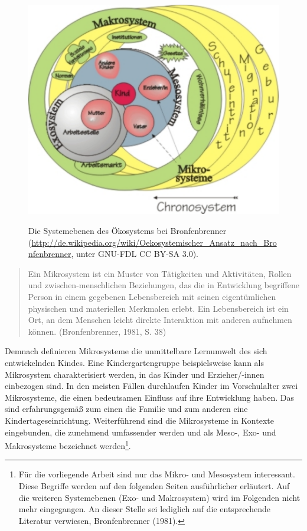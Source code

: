 \documentclass[12pt,a4paper]{article}
\begin{document}
\begin{figure}[h]
\centering
\includegraphics[scale=0.6]{figures/OekosystemBronfenbrenner}
\label{fig_bronf}
\caption{Die Systemebenen des Ökosystems bei Bronfenbrenner (\url{http://de.wikipedia.org/wiki/Oekosystemischer_Ansatz_nach_Bronfenbrenner}, unter GNU-FDL CC BY-SA 3.0).}
\end{figure}

 \begin{quote}
Ein Mikrosystem ist ein Muster von Tätigkeiten und Aktivitäten, Rollen und zwischen-menschlichen Beziehungen, das die in Entwicklung begriffene Person in einem gegebenen Lebensbereich mit seinen eigentümlichen physischen und materiellen Merkmalen erlebt. Ein Lebensbereich ist ein Ort, an dem Menschen leicht direkte Interaktion mit anderen aufnehmen können.  (Bronfenbrenner, 1981, S. 38)
 \end{quote}
Demnach definieren Mikrosysteme die unmittelbare Lernumwelt des sich entwickelnden Kindes. Eine Kindergartengruppe beispielsweise kann als Mikrosystem charakterisiert werden, in das Kinder und Erzieher/-innen einbezogen sind. In den meisten Fällen durchlaufen Kinder im Vorschulalter zwei Mikrosysteme, die einen bedeutsamen Einfluss auf ihre Entwicklung haben. Das sind erfahrungsgemäß zum einen die Familie und zum anderen eine Kindertageseinrichtung. Weiterführend sind die Mikrosysteme in Kontexte eingebunden, die zunehmend umfassender werden und als Meso-, Exo- und Makrosysteme bezeichnet werden\footnote{Für die vorliegende Arbeit sind nur das Mikro- und Mesosystem interessant. Diese Begriffe werden auf den folgenden Seiten ausführlicher erläutert. Auf die weiteren Systemebenen (Exo- und Makrosystem) wird im Folgenden nicht mehr eingegangen. An dieser Stelle sei lediglich auf die entsprechende Literatur verwiesen, Bronfenbrenner (1981).}. 
\end{document}
